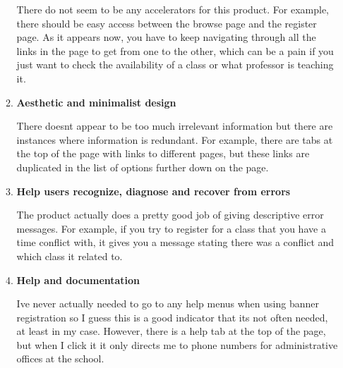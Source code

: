 \documentclass[11pt]{article}
\begin{document}
\begin{enumerate}[a)]
\begin{enumerate}[1)]
There do not seem to be any accelerators for this product.  For example, there should be easy access between the browse page and the register page.  As it appears now, you have to keep navigating through all the links in the page to get from one to the other, which can be a pain if you just want to check the availability of a class or what professor is teaching it.  
\item \textbf{Aesthetic and minimalist design}

There doesn\textquotesingle t appear to be too much irrelevant information but there are instances where information is redundant.  For example, there are tabs at the top of the page with links to different pages, but these links are duplicated in the list of options further down on the page.  
\item \textbf{Help users recognize, diagnose and recover from errors}

The product actually does a pretty good job of giving descriptive error messages.  For example, if you try to register for a class that you have a time conflict with, it gives you a message stating there was a conflict and which class it related to.  
\item \textbf{Help and documentation}

I\textquotesingle ve never actually needed to go to any help menus when using banner registration so I guess this is a good indicator that it\textquotesingle s not often needed, at least in my case.  However, there is a help tab at the top of the page, but when I click it it only directs me to phone numbers for administrative offices at the school.  
\end{enumerate}
\end{enumerate}
\end{document}
